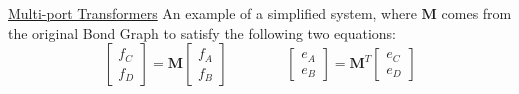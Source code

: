 \documentclass[ 12pt, twocolumn]{article}    %
\begin{document}
\noindent
\underline{Multi-port Transformers}
\vspace{10pt}
\newline
An example of a simplified system, where \(\textbf{M}\) comes from the original Bond Graph to satisfy the following two equations:
\begin{equation*}
    \begin{bmatrix}
        f_C\\ f_D
    \end{bmatrix} 
    = \textbf{M}
    \begin{bmatrix}
        f_A\\ f_B
    \end{bmatrix} \hspace{50pt} 
    \begin{bmatrix}
        e_A\\ e_B 
    \end{bmatrix}
    = \textbf{M}^T 
    \begin{bmatrix}
        e_C\\ e_D
    \end{bmatrix}
\end{equation*}
%
\begin{center}
        \begin{footnotesize}
    \end{footnotesize}
\end{center}



\newpage
\end{document}
